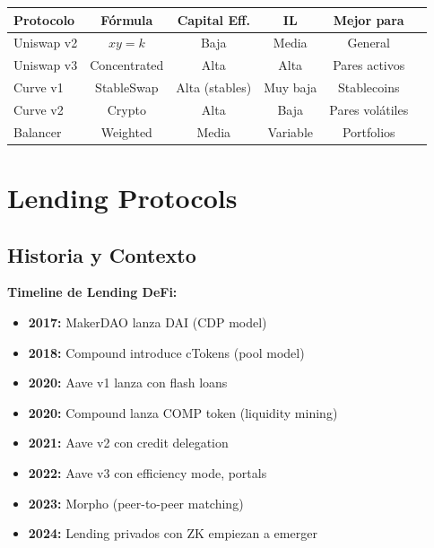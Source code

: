 \documentclass[11pt,a4paper,twoside]{book}
\begin{document}
\begin{center}
\begin{tabular}{lccccc}
\toprule
\textbf{Protocolo} & \textbf{F\'ormula} & \textbf{Capital Eff.} & \textbf{IL} & \textbf{Mejor para} \\
\midrule
Uniswap v2 & $xy=k$ & Baja & Media & General \\
Uniswap v3 & Concentrated & Alta & Alta & Pares activos \\
Curve v1 & StableSwap & Alta (stables) & Muy baja & Stablecoins \\
Curve v2 & Crypto & Alta & Baja & Pares vol\'atiles \\
Balancer & Weighted & Media & Variable & Portfolios \\
\bottomrule
\end{tabular}
\end{center}

\section{Lending Protocols}
\label{sec:lending}

\subsection{Historia y Contexto}

\begin{mathnote}
\textbf{Timeline de Lending DeFi:}
\begin{itemize}
    \item \textbf{2017:} MakerDAO lanza DAI (CDP model)
    \item \textbf{2018:} Compound introduce cTokens (pool model)
    \item \textbf{2020:} Aave v1 lanza con flash loans
    \item \textbf{2020:} Compound lanza COMP token (liquidity mining)
    \item \textbf{2021:} Aave v2 con credit delegation
    \item \textbf{2022:} Aave v3 con efficiency mode, portals
    \item \textbf{2023:} Morpho (peer-to-peer matching)
    \item \textbf{2024:} Lending privados con ZK empiezan a emerger
\end{itemize}
\end{mathnote}
\end{document}
